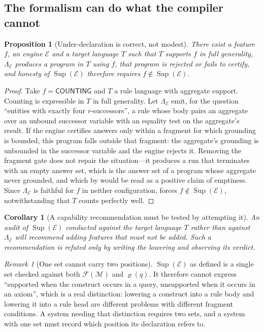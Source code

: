 \documentclass[11pt,a4paper]{article}
\theoremstyle{plain}
\newtheorem{proposition}[theorem]{Proposition}
\newtheorem{corollary}[theorem]{Corollary}
\theoremstyle{definition}
\theoremstyle{remark}
\newtheorem{remark}[theorem]{Remark}
\newcommand{\Model}{\mathcal{M}}          %
\newcommand{\Engine}{\mathcal{E}}         %
\newcommand{\Feat}{\mathcal{F}}           %
\newcommand{\req}{\varrho}                %
\renewcommand{\sup}{\operatorname{Sup}}   %
\newcommand{\lowr}{\Lambda}               %
\newcommand{\qq}{q}
\begin{document}
\subsection{The formalism can do what the compiler cannot}

\begin{proposition}[Under-declaration is correct, not modest]
\label{prop:under}
There exist a feature $f$, an engine $\Engine$ and a target language $T$ such
that $T$ supports $f$ in full generality, $\lowr_\Engine$ produces a program
in $T$ using $f$, that program is rejected or fails to certify, and honesty of
$\sup(\Engine)$ therefore requires $f \notin \sup(\Engine)$.
\end{proposition}

\begin{proof}
Take $f = \textsf{COUNTING}$ and $T$ a rule language with aggregate support.
Counting is expressible in $T$ in full generality. Let $\lowr_\Engine$ emit,
for the question ``entities with exactly four $r$-successors'', a rule whose
body pairs an aggregate over an unbound successor variable with an equality
test on the aggregate's result. If the engine certifies answers only within a
fragment for which grounding is bounded, this program falls outside that
fragment: the aggregate's grounding is unbounded in the successor variable and
the engine rejects it. Removing the fragment gate does not repair the
situation---it produces a run that terminates with an empty answer set, which
is the answer set of a program whose aggregate never grounded, and which by
 would be read as a positive claim of emptiness.
Since $\lowr_\Engine$ is faithful for $f$ in neither configuration,
 forces $f \notin \sup(\Engine)$, notwithstanding that $T$
counts perfectly well.
\end{proof}

\begin{corollary}[A capability recommendation must be tested by attempting it]
\label{cor:test-the-recommendation}
An audit of $\sup(\Engine)$ conducted against the target language $T$ rather
than against $\lowr_\Engine$ will recommend adding features that must not be
added. Such a recommendation is refuted only by writing the lowering and
observing its verdict.
\end{corollary}

\begin{remark}[One set cannot carry two positions]
\label{rem:one-set}
$\sup(\Engine)$ as defined is a single set checked against both
$\Feat(\Model)$ and $\req(\qq)$. It therefore cannot express ``supported when
the construct occurs in a query, unsupported when it occurs in an axiom'',
which is a real distinction: lowering a construct into a rule body and
lowering it into a rule head are different problems with different fragment
conditions. A system needing that distinction requires two sets, and a system
with one set must record which position its declaration refers to.
\end{remark}
\end{document}
